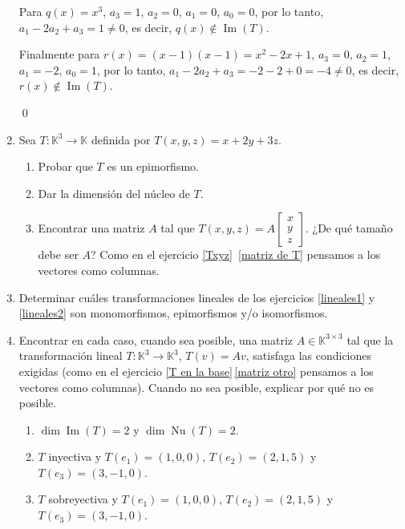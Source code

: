 \begin{enumerate}[topsep=6pt, itemsep=.4cm]
    Para $q(x)=x^3$, $a_3=1$, $a_2=0$, $a_1=0$, $a_0=0$, por lo tanto, $a_1-2a_2+a_3=1 \ne 0$, es decir, $q(x) \notin \operatorname{Im}(T)$. 
    
    Finalmente para $r(x)=(x-1)(x-1) = x^2 -2x +1$, $a_3=0$, $a_2=1$, $a_1=-2$, $a_0=1$, por lo tanto, $a_1-2a_2+a_3=-2-2+0=-4 \ne 0$, es decir, $r(x) \notin \operatorname{Im}(T)$.
    
    \qed


    \item\label{funcional ej}  Sea $T:\mathbb{K}^3\longrightarrow\mathbb{K}$ definida por $T(x,y,z)=x+2y+3z$.
    \begin{enumerate}
        \item Probar que $T$ es un epimorfismo.
        \item Dar la dimensión del núcleo de $T$.
        \item Encontrar una matriz $A$ tal que
            $T(x,y,z)=A\begin{bmatrix}
            x\\y\\z \end{bmatrix}$. ¿De qué tamaño debe ser $A$? Como en el ejercicio \ref{Txyz}\, \ref{matriz de T} pensamos a los vectores como columnas. 
    \end{enumerate}
    
    \rta
    
    \item Determinar cuáles transformaciones lineales de los ejercicios  \ref{lineales1} y \ref{lineales2} son monomorfismos, epimorfismos y/o isomorfismos.
    
    \rta
    
    \item\label{usar-1} Encontrar en cada caso, cuando sea posible, una matriz $A\in\mathbb{K}^{3\times 3}$ tal que la transformación lineal $T:\mathbb{K}^3\longrightarrow\mathbb{K}^3$, $T(v)=Av$, satisfaga las condiciones exigidas (como en el ejercicio  \ref{T en la base}\,\ref{matriz otro} pensamos a los vectores como columnas). Cuando no sea posible, explicar por qué no es posible.
    \begin{enumerate}[ topsep=5pt,itemsep=5pt]
        \item $\operatorname{dim} \operatorname{Im}(T)=2$ y $\operatorname{dim}\operatorname{Nu}(T)=2$.
        \item $T$ inyectiva y $T(e_1)=(1,0,0)$, $T(e_2)=(2,1,5)$ y $T(e_3)=(3,-1,0)$.
        \item $T$ sobreyectiva y $T(e_1)=(1,0,0)$, $T(e_2)=(2,1,5)$ y $T(e_3)=(3,-1,0)$.
        

\end{enumerate}
\end{enumerate}

